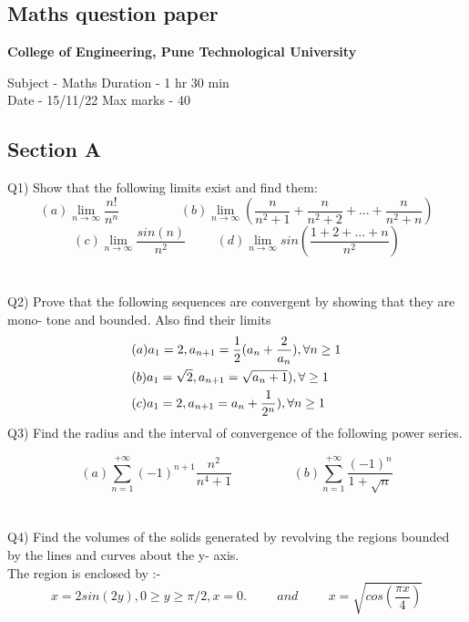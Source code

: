 \documentclass[12pt]{article}
\begin{document}
\begin{large}
\section{Maths question paper}
\begin{center}
\textbf{College of Engineering, Pune Technological University}
\end{center}
Subject - Maths\hspace{5cm} Duration - 1 hr 30 min\\
Date - 15/11/22\hspace{5cm} Max marks - 40
\subsection*{Section A}
\noindent Q1) Show that the following limits exist and find them:
\begin{equation*}
(a)\lim_{n\to\infty} \frac{n!}{n^n}\hspace{2cm}
(b) \lim_{n\to\infty} (\frac{n}{n^2 + 1} + \frac{n}{n^2 + 2} + ... + \frac{n}{n^2 + n})
\end{equation*}
\begin{equation*}
(c) \lim_{n\to\infty} \frac{sin(n)}{n^2}\hspace{1cm}
(d) \lim_{n\to\infty} sin(\frac{1 + 2 + ... + n}{n^2})
\end{equation*}
\\\\
\noindent Q2) Prove that the following sequences are convergent by showing that they are mono-
tone and bounded. Also find their limits\\
\begin{align*}
&(a)a_1 = 2,a_{n+1} = \frac{1}{2}(a_n + \frac{2}{a_n}), \forall n \ge 1\\
\vspace{1mm}
&(b)a_1 = \sqrt{2},a_{n+1} = \sqrt{a_n + 1}), \forall\ge 1\\
\vspace{1mm}
&(c)a_1 = 2,a_{n+1} = a_n + \frac{1}{2^n}), \forall n \ge 1\\
\end{align*}
Q3) Find the radius and the interval of convergence of the following power series.

\begin{equation*}
(a) \sum_{n = 1}^{+\infty} (-1)^{n + 1} \frac{n^2}{n^4 + 1} \hspace{2cm} (b) \sum_{n = 1}^{+\infty} \frac{(-1)^n}{1 + \sqrt{n}}
\end{equation*}
\\\\
\noindent Q4) Find the volumes of the solids generated by revolving the regions bounded by the
lines and curves about the y- axis.\\
The region is enclosed by :-
\begin{equation*}
 x = 2sin(2y), 0 \geq y \geq \pi /2, x = 0. \hspace{1cm}and \hspace{1cm} x = \sqrt{cos(\frac{\pi x}{4})}
\end{equation*}

\end{large}
\end{document}
